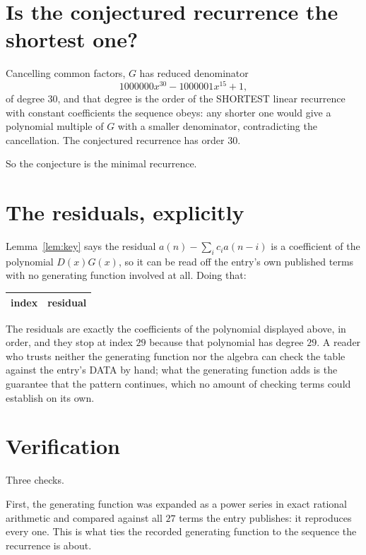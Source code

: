 \documentclass[11pt,a4paper]{article}
\theoremstyle{plain}
\theoremstyle{definition}
\begin{document}
\section{Is the conjectured recurrence the shortest one?}

Cancelling common factors, $G$ has reduced denominator
\[
1000000 x^{30} - 1000001 x^{15} + 1,
\]
of degree $30$, and that degree is the order of the SHORTEST linear recurrence with
constant coefficients the sequence obeys: any shorter one would give a polynomial multiple of
$G$ with a smaller denominator, contradicting the cancellation. The conjectured recurrence has
order $30$.

So the conjecture is the minimal recurrence.

\section{The residuals, explicitly}

Lemma~\ref{lem:key} says the residual $a(n)-\sum_ic_ia(n-i)$ is a coefficient of the
polynomial $D(x)G(x)$, so it can be read off the entry's own published terms with no
generating function involved at all. Doing that:
\begin{center}
\begin{tabular}{cc}
index & residual \\ \hline

\end{tabular}
\end{center}
The residuals are exactly the coefficients of the polynomial displayed above, in order, and
they stop at index $29$ because that polynomial has degree $29$. A reader who trusts
neither the generating function nor the algebra can check the table against the entry's DATA
by hand; what the generating function adds is the guarantee that the pattern continues, which
no amount of checking terms could establish on its own.

\section{Verification}

Three checks.

First, the generating function was expanded as a power series in exact rational arithmetic and
compared against all $27$ terms the entry publishes: it reproduces every one. This is
what ties the recorded generating function to the sequence the recurrence is about.
\end{document}
